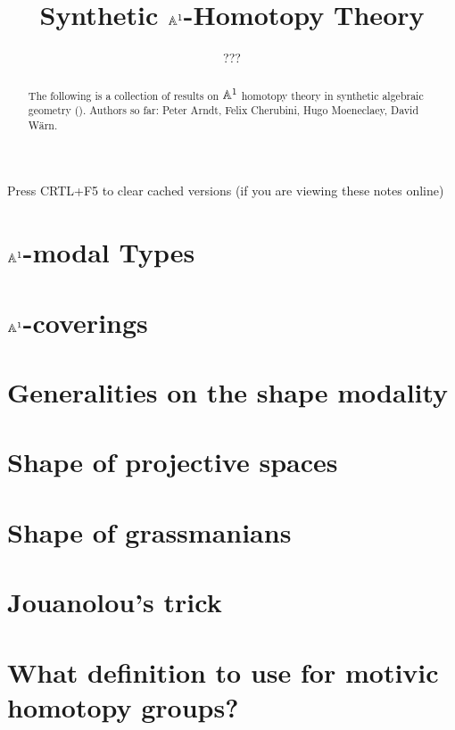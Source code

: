 \documentclass{../util/zariski}
\title{Synthetic $\mathbb{A}^1$-Homotopy Theory}
\author{???}
\begin{document}
\maketitle

\begin{center}
  \color{purple}
  \large{Press CRTL+F5 to clear cached versions}
  \large{(if you are viewing these notes online)}
\end{center}

\begin{abstract}
  The following is a collection of results on $\mathbb{A}^1$ homotopy theory in synthetic algebraic geometry (\cite{draft}).
  Authors so far: Peter Arndt, Felix Cherubini, Hugo Moeneclaey, David Wärn. 
\end{abstract}

\tableofcontents

\section{$\mathbb{A}^1$-modal Types}


%

\section{$\mathbb{A}^1$-coverings}


\section{Generalities on the shape modality}


\section{Shape of projective spaces}


\section{Shape of grassmanians}


\section{Jouanolou's trick}


\section{What definition to use for motivic homotopy groups?}


\printindex

\printbibliography
\end{document}
